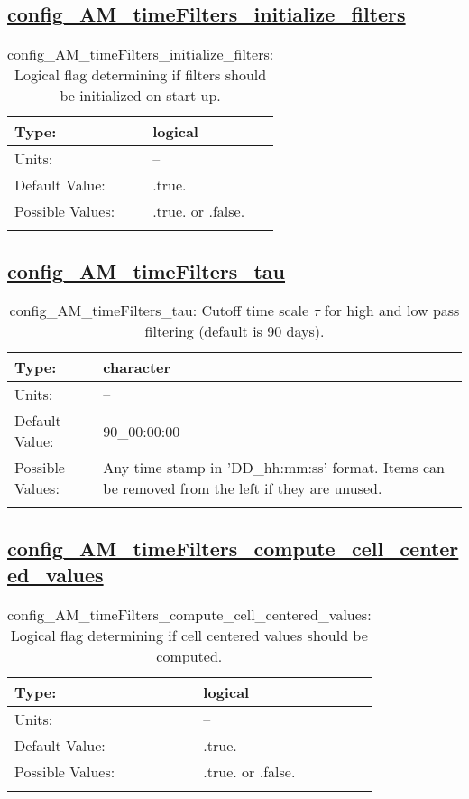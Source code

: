 \subsection[config\_AM\_timeFilters\_initialize\_filters]{\hyperref[sec:nm_tab_AM_timeFilters]{config\_AM\_timeFilters\_initialize\_filters}}
\label{subsec:nm_sec_config_AM_timeFilters_initialize_filters}
\begin{center}
\begin{longtable}{| p{2.0in} || p{4.0in} |}
    \hline
    Type: & logical \\
    \hline
    Units: & -- \\
    \hline
    Default Value: & .true. \\
    \hline
    Possible Values: & .true. or .false. \\
    \hline
    \caption{config\_AM\_timeFilters\_initialize\_filters: Logical flag determining if filters should be initialized on start-up.}
\end{longtable}
\end{center}
\subsection[config\_AM\_timeFilters\_tau]{\hyperref[sec:nm_tab_AM_timeFilters]{config\_AM\_timeFilters\_tau}}
\label{subsec:nm_sec_config_AM_timeFilters_tau}
\begin{center}
\begin{longtable}{| p{2.0in} || p{4.0in} |}
    \hline
    Type: & character \\
    \hline
    Units: & -- \\
    \hline
    Default Value: & 90\_00:00:00 \\
    \hline
    Possible Values: & Any time stamp in 'DD\_hh:mm:ss' format. Items can be removed from the left if they are unused. \\
    \hline
    \caption{config\_AM\_timeFilters\_tau: Cutoff time scale $\tau$ for high and low pass filtering (default is 90 days).}
\end{longtable}
\end{center}
\subsection[config\_AM\_timeFilters\_compute\_cell\_centered\_values]{\hyperref[sec:nm_tab_AM_timeFilters]{config\_AM\_timeFilters\_compute\_cell\_centered\_values}}
\label{subsec:nm_sec_config_AM_timeFilters_compute_cell_centered_values}
\begin{center}
\begin{longtable}{| p{2.0in} || p{4.0in} |}
    \hline
    Type: & logical \\
    \hline
    Units: & -- \\
    \hline
    Default Value: & .true. \\
    \hline
    Possible Values: & .true. or .false. \\
    \hline
    \caption{config\_AM\_timeFilters\_compute\_cell\_centered\_values: Logical flag determining if cell centered values should be computed.}
\end{longtable}
\end{center}
